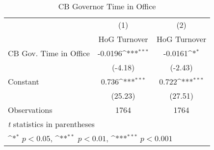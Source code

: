\begin{table}[htbp]\centering
\def\sym#1{\ifmmode^{#1}\else\(^{#1}\)\fi}
\caption{CB Governor Time in Office \label{timeinoffHOGalone}}
\begin{tabular}{l*{2}{c}}
\toprule
                                        &\multicolumn{1}{c}{(1)}&\multicolumn{1}{c}{(2)}\\
                                        &\multicolumn{1}{c}{HoG Turnover}&\multicolumn{1}{c}{HoG Turnover}\\
\midrule
CB Gov. Time in Office                  &  -0.0196\sym{***}&  -0.0161\sym{*}  \\
                                        &  (-4.18)         &  (-2.43)         \\
\addlinespace
Constant                                &    0.736\sym{***}&    0.722\sym{***}\\
                                        &  (25.23)         &  (27.51)         \\
\midrule
Observations                            &     1764         &     1764         \\
\bottomrule
\multicolumn{3}{l}{\footnotesize \textit{t} statistics in parentheses}\\
\multicolumn{3}{l}{\footnotesize \sym{*} \(p<0.05\), \sym{**} \(p<0.01\), \sym{***} \(p<0.001\)}\\
\end{tabular}
\end{table}
